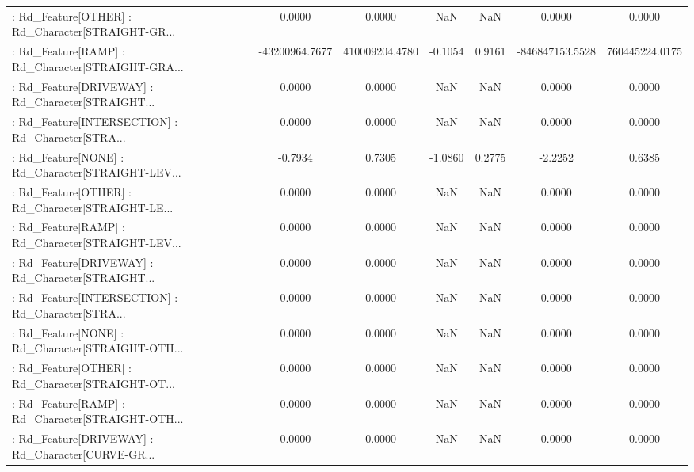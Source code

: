 \begin{longtable}{p{4cm}cccccc}
 : Rd\_Feature[OTHER] : Rd\_Character[STRAIGHT-GR... &            0.0000 &            0.0000 &     NaN &          NaN &             0.0000 &            0.0000 \\
 : Rd\_Feature[RAMP] : Rd\_Character[STRAIGHT-GRA... &    -43200964.7677 &    410009204.4780 & -0.1054 &       0.9161 &    -846847153.5528 &    760445224.0175 \\
 : Rd\_Feature[DRIVEWAY] : Rd\_Character[STRAIGHT... &            0.0000 &            0.0000 &     NaN &          NaN &             0.0000 &            0.0000 \\
 : Rd\_Feature[INTERSECTION] : Rd\_Character[STRA... &            0.0000 &            0.0000 &     NaN &          NaN &             0.0000 &            0.0000 \\
 : Rd\_Feature[NONE] : Rd\_Character[STRAIGHT-LEV... &           -0.7934 &            0.7305 & -1.0860 &       0.2775 &            -2.2252 &            0.6385 \\
 : Rd\_Feature[OTHER] : Rd\_Character[STRAIGHT-LE... &            0.0000 &            0.0000 &     NaN &          NaN &             0.0000 &            0.0000 \\
 : Rd\_Feature[RAMP] : Rd\_Character[STRAIGHT-LEV... &            0.0000 &            0.0000 &     NaN &          NaN &             0.0000 &            0.0000 \\
 : Rd\_Feature[DRIVEWAY] : Rd\_Character[STRAIGHT... &            0.0000 &            0.0000 &     NaN &          NaN &             0.0000 &            0.0000 \\
 : Rd\_Feature[INTERSECTION] : Rd\_Character[STRA... &            0.0000 &            0.0000 &     NaN &          NaN &             0.0000 &            0.0000 \\
 : Rd\_Feature[NONE] : Rd\_Character[STRAIGHT-OTH... &            0.0000 &            0.0000 &     NaN &          NaN &             0.0000 &            0.0000 \\
 : Rd\_Feature[OTHER] : Rd\_Character[STRAIGHT-OT... &            0.0000 &            0.0000 &     NaN &          NaN &             0.0000 &            0.0000 \\
 : Rd\_Feature[RAMP] : Rd\_Character[STRAIGHT-OTH... &            0.0000 &            0.0000 &     NaN &          NaN &             0.0000 &            0.0000 \\
 : Rd\_Feature[DRIVEWAY] : Rd\_Character[CURVE-GR... &            0.0000 &            0.0000 &     NaN &          NaN &             0.0000 &            0.0000 \\

\end{longtable}
